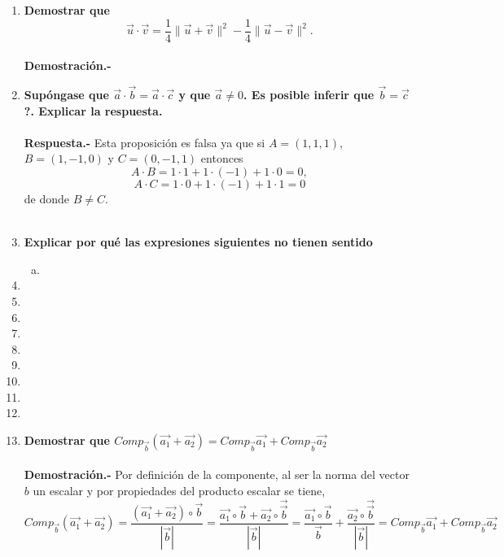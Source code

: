 \begin{enumerate}
\item \textbf{\boldmath Demostrar que 
    $$\vec{u}\cdot \vec{v} = \dfrac{1}{4} \|\vec{u}+\vec{v}\|^2 - \dfrac{1}{4} \|\vec{u}-\vec{v}\|^2.$$\\
    Demostración.-}\;


\item \textbf{\boldmath Supóngase que $\vec{a}\cdot \vec{b} = \vec{a}\cdot \vec{c}$ y que $\vec{a}\neq 0$. Es posible inferir que $\vec{b}=\vec{c}$?. Explicar la respuesta.\\\\
    Respuesta.-}\; Esta proposición es falsa ya que si $A=(1,1,1)$, $B=(1,-1,0)$ y $C=(0,-1,1)$ entonces $$A\cdot B = 1\cdot 1 + 1\cdot(-1)+1\cdot 0 = 0,$$ $$A\cdot C = 1\cdot 0 + 1\cdot(-1)+1\cdot 1 = 0$$
    de donde $B\neq C$.\\\\ 

\item \textbf{\boldmath Explicar por qué las expresiones siguientes no tienen sentido}

    \begin{enumerate}[a)]

	\item 

    \end{enumerate}

\item 

\item 

\item 

\item 

\item 

\item 

\item 

\item 

\item 

\item \textbf{\boldmath Demostrar que $Comp_{\vec{b}}\left(\vec{a_1}+\vec{a_2}\right) = Comp_{\vec{b}}\vec{a_1} + Comp_{\vec{b}}\vec{a_2}$\\\\
    Demostración.-}\; Por definición de la componente, al ser la norma del vector $b$ un escalar y por propiedades del producto escalar se tiene, 
    $$Comp_{\vec{b}}\left(\vec{a_1}+\vec{a_2}\right) = \dfrac{\left(\vec{a_1}+\vec{a_2}\right)\circ \vec{b}}{|\vec{b}|}=\dfrac{\vec{a_1}\circ \vec{b} + \vec{a_2} \circ \vec{\vec{b}}}{|\vec{b}|} = \dfrac{\vec{a_1}\circ \vec{b}}{\vec{b}} + \dfrac{\vec{a_2} \circ \vec{\vec{b}}}{|\vec{b}|} =  Comp_{\vec{b}}\vec{a_1} + Comp_{\vec{b}}\vec{a_2}$$\\


\end{enumerate}

